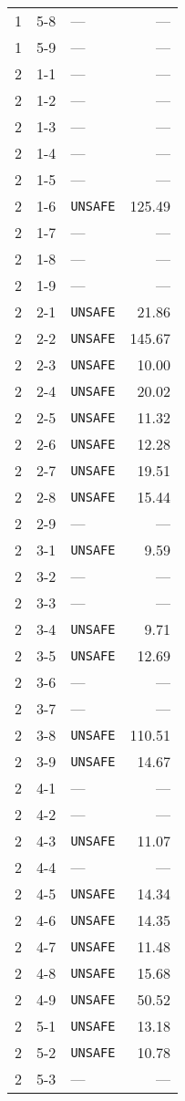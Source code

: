 \documentclass{article}%
\begin{document}
\begin{longtable}{@{}cll|r@{}}
1&5{-}8&—&—\\%
1&5{-}9&—&—\\%
2&1{-}1&—&—\\%
2&1{-}2&—&—\\%
2&1{-}3&—&—\\%
2&1{-}4&—&—\\%
2&1{-}5&—&—\\%
2&1{-}6&\verb|UNSAFE|&125.49\\%
2&1{-}7&—&—\\%
2&1{-}8&—&—\\%
2&1{-}9&—&—\\%
2&2{-}1&\verb|UNSAFE|&21.86\\%
2&2{-}2&\verb|UNSAFE|&145.67\\%
2&2{-}3&\verb|UNSAFE|&10.00\\%
2&2{-}4&\verb|UNSAFE|&20.02\\%
2&2{-}5&\verb|UNSAFE|&11.32\\%
2&2{-}6&\verb|UNSAFE|&12.28\\%
2&2{-}7&\verb|UNSAFE|&19.51\\%
2&2{-}8&\verb|UNSAFE|&15.44\\%
2&2{-}9&—&—\\%
2&3{-}1&\verb|UNSAFE|&9.59\\%
2&3{-}2&—&—\\%
2&3{-}3&—&—\\%
2&3{-}4&\verb|UNSAFE|&9.71\\%
2&3{-}5&\verb|UNSAFE|&12.69\\%
2&3{-}6&—&—\\%
2&3{-}7&—&—\\%
2&3{-}8&\verb|UNSAFE|&110.51\\%
2&3{-}9&\verb|UNSAFE|&14.67\\%
2&4{-}1&—&—\\%
2&4{-}2&—&—\\%
2&4{-}3&\verb|UNSAFE|&11.07\\%
2&4{-}4&—&—\\%
2&4{-}5&\verb|UNSAFE|&14.34\\%
2&4{-}6&\verb|UNSAFE|&14.35\\%
2&4{-}7&\verb|UNSAFE|&11.48\\%
2&4{-}8&\verb|UNSAFE|&15.68\\%
2&4{-}9&\verb|UNSAFE|&50.52\\%
2&5{-}1&\verb|UNSAFE|&13.18\\%
2&5{-}2&\verb|UNSAFE|&10.78\\%
2&5{-}3&—&—\\%

\end{longtable}
\end{document}
